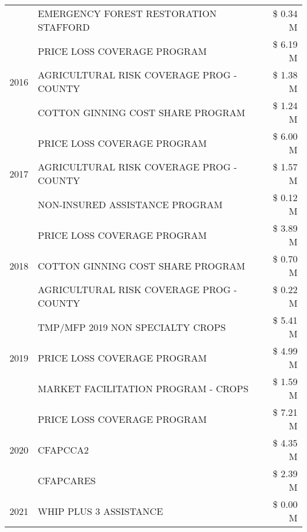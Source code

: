 \begin{tabular}{llr}
 & EMERGENCY FOREST RESTORATION STAFFORD & \$ 0.34 M \\
\cline{1-3}
\multirow[t]{3}{*}{2016} & PRICE LOSS COVERAGE PROGRAM                   & \$ 6.19 M \\
 & AGRICULTURAL RISK COVERAGE PROG - COUNTY      & \$ 1.38 M \\
 & COTTON GINNING COST SHARE PROGRAM             & \$ 1.24 M \\
\cline{1-3}
\multirow[t]{3}{*}{2017} & PRICE LOSS COVERAGE PROGRAM & \$ 6.00 M \\
 & AGRICULTURAL RISK COVERAGE PROG - COUNTY & \$ 1.57 M \\
 & NON-INSURED ASSISTANCE PROGRAM & \$ 0.12 M \\
\cline{1-3}
\multirow[t]{3}{*}{2018} & PRICE LOSS COVERAGE PROGRAM & \$ 3.89 M \\
 & COTTON GINNING COST SHARE PROGRAM & \$ 0.70 M \\
 & AGRICULTURAL RISK COVERAGE PROG - COUNTY & \$ 0.22 M \\
\cline{1-3}
\multirow[t]{3}{*}{2019} & TMP/MFP 2019 NON SPECIALTY CROPS & \$ 5.41 M \\
 & PRICE LOSS COVERAGE PROGRAM & \$ 4.99 M \\
 & MARKET FACILITATION PROGRAM - CROPS & \$ 1.59 M \\
\cline{1-3}
\multirow[t]{3}{*}{2020} & PRICE LOSS COVERAGE PROGRAM & \$ 7.21 M \\
 & CFAPCCA2 & \$ 4.35 M \\
 & CFAPCARES & \$ 2.39 M \\
\cline{1-3}
2021 & WHIP PLUS 3 ASSISTANCE & \$ 0.00 M \\
\cline{1-3}
\bottomrule
\end{tabular}
